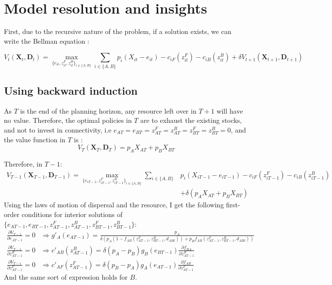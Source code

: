 \documentclass{article}
\begin{document}
\section{Model resolution and insights}
First, due to the recursive nature of the problem, if a solution exists, we can write the Bellman equation : 

\begin{equation}
    V_t(\mathbf{X}_t, \mathbf{D}_t) = \max_{\{e_{it}, z_{it}^F, z_{it}^B\}_{i \in \{A,B\}}} \sum_{i \in \{A,B\}} p_i(X_{it} - e_{it}) - c_{iF}(z_{it}^F) - c_{iB}(z_{it}^B) + \delta V_{t+1}(\mathbf{X}_{t+1}, \mathbf{D}_{t+1})
\end{equation}
\subsection{Using backward induction}
As $T$ is the end of the planning horizon, any resource left over in $T+1$ will have no value. Therefore, the optimal policies in $T$ are to exhaust the existing stocks, and not to invest in connectivity, i.e $e_{AT}=e_{BT}=z_{AT}^F = z_{AT}^B = z_{BT}^F = z_{BT}^B=0$, and the value function in $T$ is :
$$
V_T(\mathbf{X}_T, \mathbf{D}_T) = p_A X_{AT} + p_B X_{BT}
$$

Therefore, in $T-1$:
\begin{align*}
    V_{T-1}(\mathbf{X}_{T-1}, \mathbf{D}_{T-1}) = \max_{\{e_{iT-1}, z_{iT-1}^F, z_{iT-1}^B \}_{i \in \{A,B\}}} \sum_{i \in \{A,B\}} & p_i(X_{iT-1} - e_{iT-1}) - c_{iF}(z_{iT-1}^F) - c_{iB}(z_{iT-1}^B) \\&+ \delta (p_A X_{AT} + p_B X_{BT})
\end{align*}
Using the laws of motion of dispersal and the resource, I get the following first-order conditions for interior solutions of $\{e_{AT-1}, e_{BT-1}, z_{AT-1}^F, z_{AT-1}^B, z_{BT-1}^F, z_{BT-1}^B\}$:
\begin{align}
    \frac{\partial V_{T-1}}{\partial e_{AT-1}} = 0 &\Rightarrow g'_A(e_{AT-1}) = \frac{p_A}{\delta (p_A (1-f_{AB}(z_{AT-1}^F, z_{BT-1}^B, d_{ABt}))+ p_B f_{AB}(z_{AT-1}^F, z_{BT-1}^B, d_{ABt}))} \label{eq:foc_e}\\
    \frac{\partial V_{T-1}}{\partial z_{AT-1}^B} = 0 &\Rightarrow c'_{AB}(z_{AT-1}^B) = \delta (p_A - p_B) g_B(e_{BT-1} )\frac{\partial f_{BA}}{\partial z_{AT-1}^B} \label{eq:foc_baiting}\\
    \frac{\partial V_{T-1}}{\partial z_{AT-1}^F} = 0 &\Rightarrow c'_{AF}(z_{AT-1}^F) = \delta (p_B - p_A) g_A(e_{AT-1} )\frac{\partial f_{AB}}{\partial z_{AT-1}^F} \label{eq:foc_fencing}
\end{align}
And the same sort of expression holds for $B$. \\\\
\end{document}

